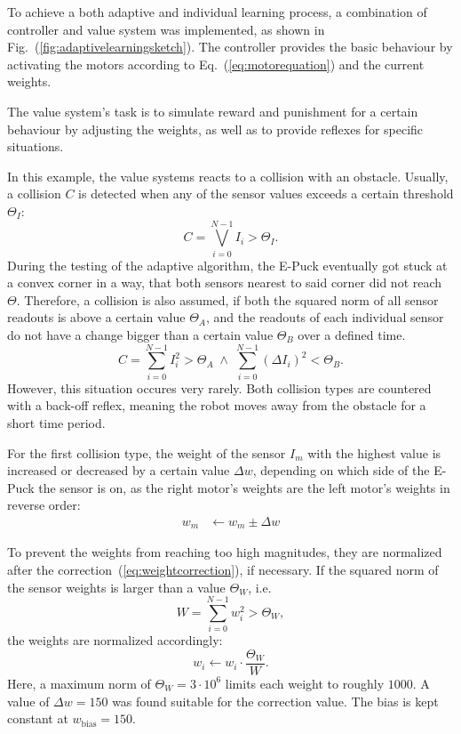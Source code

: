 \documentclass[a4paper]{jacow}
\begin{document}
To achieve a both adaptive and individual learning process, a combination of controller and value system was implemented, as shown in Fig.~(\ref{fig:adaptivelearningsketch}). The controller provides the basic behaviour by activating the motors according to Eq.~(\ref{eq:motorequation}) and the current weights.

The value system's task is to simulate reward and punishment for a certain behaviour by adjusting the weights, as well as to provide reflexes for specific situations.

In this example, the value systems reacts to a collision with an obstacle. Usually, a collision $C$ is detected when any of the sensor values exceeds a certain threshold $\Theta_I$:
\begin{equation}
	C = \bigvee\limits_{i=0}^{N-1} I_i > \Theta_I. 
\end{equation}
During the testing of the adaptive algorithm, the E-Puck eventually got stuck at a convex corner in a way, that both sensors nearest to said corner did not reach $\Theta$. Therefore, a collision is also assumed, if both the squared norm of all sensor readouts is above a certain value $\Theta_A$, and the readouts of each individual sensor do not have a change bigger than a certain value $\Theta_B$ over a defined time.
\begin{equation}
	C = \sum\limits_{i=0}^{N-1} I_i^2 > \Theta_A \;\wedge\; \sum\limits_{i=0}^{N-1} (\Delta I_i)^2 < \Theta_B.
\end{equation}
However, this situation occures very rarely. 
Both collision types are countered with a back-off reflex, meaning the robot moves away from the obstacle for a short time period.

For the first collision type, the weight of the sensor $I_m$ with the highest value is increased or decreased by a certain value $\Delta w$, depending on which side of the E-Puck the sensor is on, as the right motor's weights are the left motor's weights in reverse order:
\begin{align}
	w_m &\leftarrow w_m \pm \Delta w\label{eq:weightcorrection}
\end{align}

To prevent the weights from reaching too high magnitudes, they are normalized after the correction~(\ref{eq:weightcorrection}), if necessary. If the squared norm of the sensor weights is larger than a value $\Theta_W$, i.e.
\begin{equation}
	W = \sum\limits_{i=0}^{N-1} w_i^2 > \Theta_W,
\end{equation}
the weights are normalized accordingly:
\begin{equation}
	w_i \leftarrow w_i \cdot \frac{\Theta_W}{W}.
\end{equation}
Here, a maximum norm of $\Theta_W=3\cdot 10^6$ limits each weight to roughly $1000$. A value of $\Delta w = 150$ was found suitable for the correction value. The bias is kept constant at $w_\text{bias} = 150$.
\end{document}
